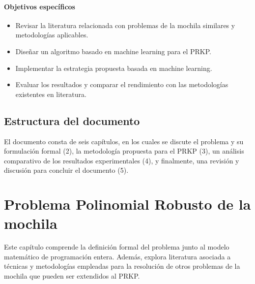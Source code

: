 \documentclass[spanish, a4paper, 12pt, openany,final]{book}
\begin{document}
\subsubsection*{Objetivos específicos}
\begin{itemize}
	\item Revisar la literatura relacionada con problemas de la mochila similares y metodologías aplicables.
	\item Diseñar un algoritmo basado en machine learning para el PRKP.
	\item Implementar la estrategia propuesta basada en machine learning.
	\item Evaluar los resultados y comparar el rendimiento con las metodologías existentes en literatura.
\end{itemize}

\section{Estructura del documento}

El documento consta de seis capítulos, en los cuales se discute el problema y su formulación formal (2), la metodología propuesta para el PRKP (3), un análisis comparativo de los resultados experimentales (4), y finalmente, una revisión y discusión para concluir el documento (5).

\clearpage

\chapter{Problema Polinomial Robusto de la mochila}
Este capítulo comprende la definición formal del problema junto al modelo matemático de programación entera. Además, explora literatura asociada a técnicas y metodologías empleadas para la resolución de otros problemas de la mochila que pueden ser extendidos al PRKP.
\end{document}

